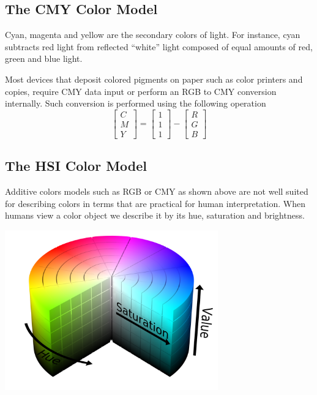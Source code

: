 \documentclass[a4paper,12pt]{article}
\begin{document}
\subsection{The CMY Color Model}
Cyan, magenta and yellow are the secondary colors of light. For instance,
cyan subtracts red light from reflected ``white'' light composed of equal
amounts of red, green and blue light.

Most devices that deposit colored pigments on paper such as color printers
and copies, require CMY data input or perform an RGB to CMY conversion
internally.  Such conversion is performed using the following operation
\[\begin{bmatrix}C\\M\\Y\end{bmatrix}
= \begin{bmatrix}1\\1\\1\end{bmatrix}
- \begin{bmatrix}R\\G\\B\end{bmatrix}\]

\subsection{The HSI Color Model}
Additive colors models such as RGB or CMY as shown above are not well suited
for describing colors in terms that are practical for human interpretation.
When humans view a color object we describe it by its hue, saturation and
brightness.
\begin{center}
  \includegraphics[width=0.69\textwidth]{hsv.png}
\end{center}
\end{document}
